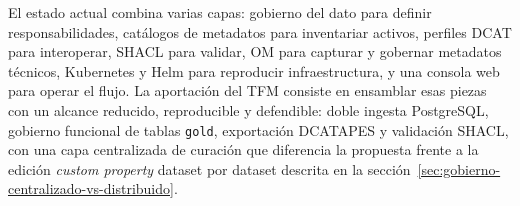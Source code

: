 El estado actual combina varias capas: gobierno del dato para definir responsabilidades, catálogos de metadatos para inventariar activos, perfiles \ac{DCAT} para interoperar, \ac{SHACL} para validar, \ac{OM} para capturar y gobernar metadatos técnicos, Kubernetes y Helm para reproducir infraestructura, y una consola web para operar el flujo. La aportación del TFM consiste en ensamblar esas piezas con un alcance reducido, reproducible y defendible: doble ingesta PostgreSQL, gobierno funcional de tablas \texttt{gold}, exportación \ac{DCATAPES} y validación \ac{SHACL}, con una capa centralizada de curación que diferencia la propuesta frente a la edición \emph{custom property} dataset por dataset descrita en la sección~\ref{sec:gobierno-centralizado-vs-distribuido}.
